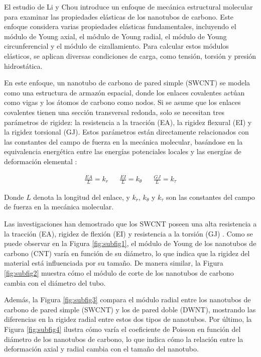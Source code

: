 \documentclass[a4paper]{article}
\begin{document}
El estudio de Li y Chou \cite{li2006modeling} introduce un enfoque de mecánica estructural molecular para examinar las propiedades elásticas de los nanotubos de carbono. Este enfoque considera varias propiedades elásticas fundamentales, incluyendo el módulo de Young axial, el módulo de Young radial, el módulo de Young circunferencial y el módulo de cizallamiento. Para calcular estos módulos elásticos, se aplican diversas condiciones de carga, como tensión, torsión y presión hidrostática.

En este enfoque, un nanotubo de carbono de pared simple (SWCNT) se modela como una estructura de armazón espacial, donde los enlaces covalentes actúan como vigas y los átomos de carbono como nodos. Si se asume que los enlaces covalentes tienen una sección transversal redonda, solo se necesitan tres parámetros de rigidez: la resistencia a la tracción (EA), la rigidez flexural (EI) y la rigidez torsional (GJ). Estos parámetros están directamente relacionados con las constantes del campo de fuerza en la mecánica molecular, basándose en la equivalencia energética entre las energías potenciales locales y las energías de deformación elemental \cite{li2006modeling}:

\begin{align}
\frac{EA}{L}=k_r && \frac{EI}{L}=k_\theta && \frac{GJ}{L}=k_\tau
\end{align}

Donde $L$ denota la longitud del enlace, y $k_r$, $k_\theta$ y $k_\tau$ son las constantes del campo de fuerza en la mecánica molecular.

Las investigaciones han demostrado que los SWCNT poseen una alta resistencia a la tracción (EA), rigidez de flexión (EI) y resistencia a la torsión (GJ) \cite{mylvaganam2004important}. Como se puede observar en la Figura \ref{fig:subfig1}, el módulo de Young de los nanotubos de carbono (CNT) varía en función de su diámetro, lo que indica que la rigidez del material está influenciada por su tamaño. De manera similar, la Figura \ref{fig:subfig2} muestra cómo el módulo de corte de los nanotubos de carbono cambia con el diámetro del tubo.

Además, la Figura \ref{fig:subfig3} compara el módulo radial entre los nanotubos de carbono de pared simple (SWCNT) y los de pared doble (DWNT), mostrando las diferencias en la rigidez radial entre estos dos tipos de nanotubos. Por último, la Figura \ref{fig:subfig4} ilustra cómo varía el coeficiente de Poisson en función del diámetro de los nanotubos de carbono, lo que indica cómo la relación entre la deformación axial y radial cambia con el tamaño del nanotubo.
\end{document}
